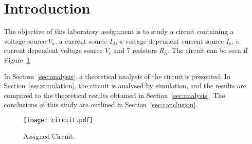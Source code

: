 \section{Introduction}
\label{sec:introduction}

The objective of this laboratory assignment is to study a circuit containing a voltage source $V_a$,
a current source $I_d$, a voltage dependent current source $I_b$, a current dependent voltage source 
$V_c$ and 7 resistors $R_n$. The circuit can be seen if Figure~\ref{fig:circuit}.

\lipsum[1-1]

In Section~\ref{sec:analysis}, a theoretical analysis of the circuit is
presented. In Section~\ref{sec:simulation}, the circuit is analysed by
simulation, and the results are compared to the theoretical results obtained in
Section~\ref{sec:analysis}. The conclusions of this study are outlined in
Section~\ref{sec:conclusion}.

\begin{figure}[h] \centering
\texttt{[image: circuit.pdf]}
\caption{Assigned Circuit.}
\label{fig:circuit}
\end{figure}

